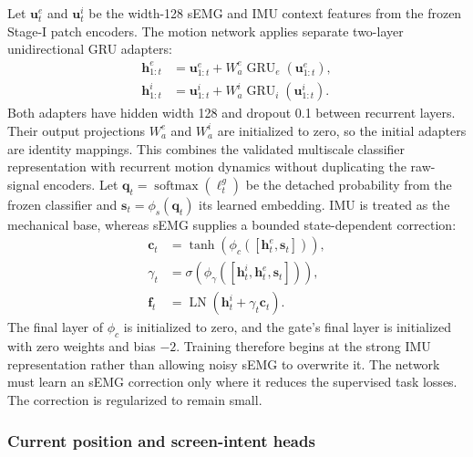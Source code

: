 Let $\mathbf{u}^{e}_t$ and $\mathbf{u}^{i}_t$ be the width-128 sEMG and IMU
context features from the frozen Stage-I patch encoders.  The motion network
applies separate two-layer unidirectional GRU adapters:
\begin{align}
 \mathbf{h}^{e}_{1:t} &= \mathbf{u}^{e}_{1:t}
       +W^e_a\operatorname{GRU}_e(\mathbf{u}^{e}_{1:t}),\\
 \mathbf{h}^{i}_{1:t} &= \mathbf{u}^{i}_{1:t}
       +W^i_a\operatorname{GRU}_i(\mathbf{u}^{i}_{1:t}).
\end{align}
Both adapters have hidden width 128 and dropout 0.1 between recurrent layers.
Their output projections $W^e_a$ and $W^i_a$ are initialized to zero, so the
initial adapters are identity mappings.  This combines the validated
multiscale classifier representation with recurrent motion dynamics without
duplicating the raw-signal encoders.
Let $\mathbf{q}_t=\operatorname{softmax}(\boldsymbol{\ell}^{g}_t)$ be the
detached probability from the frozen classifier and
$\mathbf{s}_t=\phi_s(\mathbf{q}_t)$ its learned embedding.  IMU is treated as
the mechanical base, whereas sEMG supplies a bounded state-dependent
correction:
\begin{align}
 \mathbf{c}_t &= \tanh\!\left(\phi_c([
      \mathbf{h}^{e}_t,\mathbf{s}_t])\right),\\
 \gamma_t &= \sigma\!\left(\phi_\gamma([
      \mathbf{h}^{i}_t,\mathbf{h}^{e}_t,\mathbf{s}_t])\right),\\
 \mathbf{f}_t &= \operatorname{LN}(\mathbf{h}^{i}_t+\gamma_t\mathbf{c}_t).
\end{align}
The final layer of $\phi_c$ is initialized to zero, and the gate's final layer
is initialized with zero weights and bias $-2$.  Training therefore begins at
the strong IMU representation rather than allowing noisy sEMG to overwrite it.
The network must learn an sEMG correction only where it reduces the supervised
task losses.  The correction is regularized to remain small.

\subsubsection{Current position and screen-intent heads}

